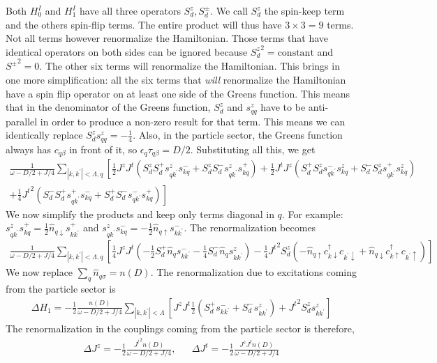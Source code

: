 \documentclass{revtex4-2}
\begin{document}
Both \(H^I_0\) and \(H^I_1\) have all three operators \(S_d^z, S_d^\pm\). We call \(S_d^z\) the spin-keep term and the others spin-flip terms. The entire product will thus have \(3\times 3 = 9\) terms. Not all terms however renormalize the Hamiltonian. Those terms that have identical operators on both sides can be ignored because \({S_d^z}^2 = \text{constant}\) and \({S^\pm}^2 = 0\). The other six terms will renormalize the Hamiltonian. This brings in one more simplification: all the six terms that \textit{will} renormalize the Hamiltonian have a spin flip operator on at least one side of the Greens function. This means that in the denominator of the Greens function, \(S_d^z\) and \(s^z_{qq}\) have to be anti-parallel in order to produce a non-zero result for that term. This means we can identically replace \(S_d^z s^z_{qq} = -\frac{1}{4}\). Also, in the particle sector, the Greens function always has \(c_{q\beta}\) in front of it, so \(\epsilon_q \tau_{q\beta} = D/2\). Substituting all this, we get
\begin{align}
	\frac{1}{\omega - D/2 + J/4}\sum_{|k,k^\prime|<\Lambda,q}\left[\frac{1}{2}J^z J^t \left(S_d^z S_d^+ s^z_{qk^\prime}s^-_{kq} + S_d^z S_d^- s^z_{qk^\prime}s^+_{kq}\right) + \frac{1}{2}J^t J^z \left(S_d^+ S_d^z s^-_{qk^\prime}s^z_{kq} + S_d^- S_d^z s^+_{qk^\prime}s^z_{kq}\right)\right.\\
+\left.\frac{1}{4}{J^t}^2 \left(S_d^- S_d^+ s^+_{qk^\prime}s^-_{kq} + S_d^+ S_d^- s^-_{qk^\prime}s^+_{kq}\right)\right]
\end{align}
We now simplify the products and keep only terms diagonal in \(q\). For example: \(s^z_{qk^\prime}s^+_{kq} = \frac{1}{2}\hat n_{q \downarrow}s^+_{kk^\prime}\) and \(s^z_{qk^\prime}s^-_{kq} = -\frac{1}{2}\hat n_{q \uparrow}s^-_{kk^\prime}\). The renormalization becomes
\begin{align}
	\frac{1}{\omega - D/2 + J/4}\sum_{|k,k^\prime|<\Lambda,q}\left[\frac{1}{4}J^z J^t \left(-\frac{1}{2}S_d^+ \hat n_{q}s^-_{kk^\prime} - \frac{1}{4}S_d^- \hat n_{q} s^z_{kk^\prime}\right) - \frac{1}{4}{J^t}^2 S_d^z\left(-\hat n_{q \uparrow}c^\dagger_{k \downarrow}c_{k^\prime \downarrow} + \hat n_{q \downarrow}c^\dagger_{k \uparrow}c_{k^\prime \uparrow}\right)\right]
\end{align}
We now replace \(\sum_q \hat n_{q\sigma} = n(D)\). The renormalization due to excitations coming from the particle sector is
\begin{align}
	\Delta H_1 = -\frac{1}{2}\frac{n(D)}{\omega - D/2 + J/4}\sum_{|k,k^\prime|<\Lambda}\left[J^z J^t \frac{1}{2}\left(S_d^+ s^-_{kk^\prime} + S_d^- s^z_{kk^\prime}\right) + {J^t}^2 S_d^z s^z_{kk^\prime}\right]
\end{align}
The renormalization in the couplings coming from the particle sector is therefore,
\begin{align}
	\label{kondo_part}
	\Delta J^z = -\frac{1}{2}\frac{{J^t}^2n(D)}{\omega - D/2 + J/4}, && \Delta J^t = -\frac{1}{2}\frac{J^z J^tn(D)}{\omega - D/2 + J/4}
\end{align}
\end{document}
